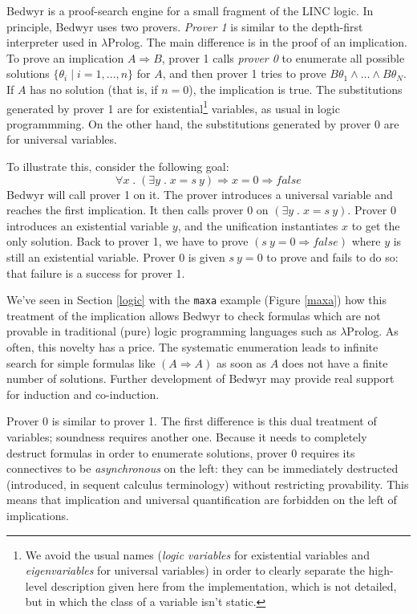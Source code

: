 \documentclass{article}
\newcommand{\lp}{$\lambda$Prolog}
\newcommand{\qs}{\; . \;}
\begin{document}
Bedwyr is a proof-search engine for a small fragment of the LINC
logic.  In principle, Bedwyr uses two provers.  {\em Prover 1} is similar to
the depth-first interpreter used in $\lambda$Prolog.  The main
difference is in the proof of an implication.  
To prove an implication $A\Rightarrow B$, prover 1  calls {\em prover 0}
to enumerate all possible solutions
$\{\theta_i\;|\;i=1,\ldots,n\}$ for $A$, 
and then prover 1 tries to prove $B\theta_1\wedge\dots\wedge B\theta_N$.
If $A$ has no solution (that is, if $n=0$), the implication is true.
The substitutions generated by prover 1 are for existential\footnote{
We avoid the usual names (\emph{logic variables} for existential variables and 
\emph{eigenvariables} for universal variables) in order to clearly separate the 
high-level description given here from the implementation, which is not 
detailed, but in which the class of a variable isn't static.}
variables, as usual in logic programmming.
On the other hand, the substitutions generated by prover 0 are for
universal variables. 

To illustrate this, 
consider the following goal:
\[ \forall x \qs (\exists y \qs x=s~y) \Rightarrow x=0 \Rightarrow false \]
Bedwyr will call prover 1 on it. The prover introduces a universal variable
and reaches the first implication.
It then calls prover 0 on $(\exists y \qs x = s~y)$.
Prover 0 introduces an existential variable $y$,
and the unification instantiates $x$ to get the only solution.
Back to prover 1, we have to prove $(s~y = 0 \Rightarrow false)$
where $y$ is still an existential variable. Prover 0 is given $s~y=0$
to prove and fails to do so: that failure is a success for prover 1.

We've seen in Section \ref{logic} with the \verb.maxa. example
(Figure \ref{maxa}) how this treatment of the implication allows
Bedwyr to check formulas which are not provable in traditional (pure) logic 
programming languages such as \lp.
As often, this novelty has a price. The systematic enumeration leads to 
infinite search for simple formulas like $(A \Rightarrow A)$ as soon as
$A$ does not have a finite number of solutions.
Further development of Bedwyr may provide
real support for induction and co-induction.

Prover 0 is similar to prover 1.
The first difference is this dual treatment of variables;
soundness requires another one.
Because it needs to completely destruct formulas in order to enumerate 
solutions, prover 0 requires its connectives to be \emph{asynchronous} on the 
left: they can be immediately destructed (introduced, in sequent
calculus terminology) without restricting provability.
This means that implication and universal quantification are forbidden on the 
left of implications.
\end{document}
